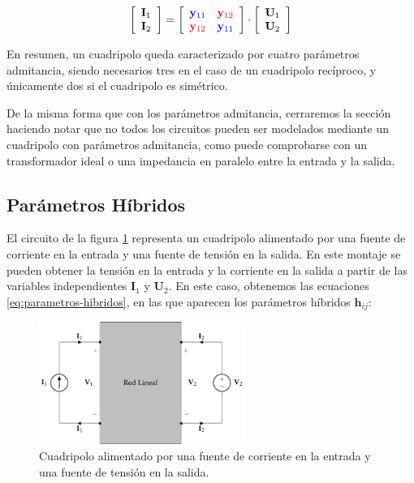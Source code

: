 \[
  \left[
    \begin{array}{c}
      \mathbf{I}_1\\
      \mathbf{I}_2
    \end{array}
  \right] = \left[
    \begin{array}{cc}
      \color{blue}{\mathbf{y}_{11}} & \color{red}{\mathbf{y}_{12}}\\
      \color{red}{\mathbf{y}_{12}} & \color{blue}{\mathbf{y}_{11}}
    \end{array}
  \right] \cdot \left[
    \begin{array}{c}
      \mathbf{U}_1\\
      \mathbf{U}_2
    \end{array}
  \right]
\]

En resumen, un cuadripolo queda caracterizado por cuatro parámetros
admitancia, siendo necesarios tres en el caso de un cuadripolo
recíproco, y únicamente dos si el cuadripolo es simétrico.

De la misma forma que con los parámetros admitancia, cerraremos la
sección haciendo notar que no todos los circuitos pueden ser modelados
mediante un cuadripolo con parámetros admitancia, como puede
comprobarse con un transformador ideal o una impedancia en paralelo
entre la entrada y la salida.


\subsection{Parámetros Híbridos}

El circuito de la figura \ref{fig:cuadripolo-hibridos} representa un
cuadripolo alimentado por una fuente de corriente en la entrada y una
fuente de tensión en la salida. En este montaje se pueden obtener la
tensión en la entrada y la corriente en la salida a partir de las
variables independientes \(\mathbf{I}_1\) y \(\mathbf{U}_2\). En este
caso, obtenemos las ecuaciones \ref{eq:parametros-hibridos}, en las
que aparecen los parámetros híbridos $\mathbf{h}_{ij}$:

\begin{figure}[H]
  \centering
  \includegraphics[height=4cm]{../figs/cuadripolo_hibrido.pdf}
  \caption{Cuadripolo alimentado por una fuente de corriente en la
    entrada y una fuente de tensión en la salida.}
  \label{fig:cuadripolo-hibridos}
\end{figure}



